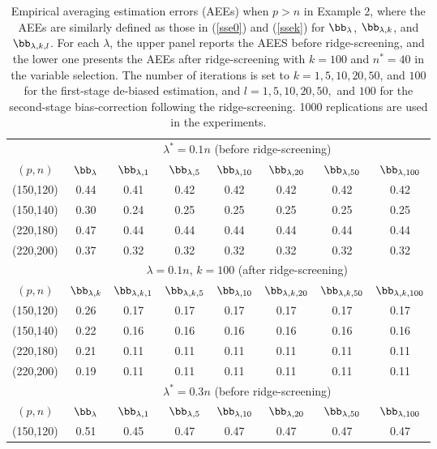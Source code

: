 {{\begin{table}[htp]\scriptsize
\caption{Empirical averaging estimation errors (AEEs) when $p> n$ in Example 2, where the AEEs are similarly defined as those in (\ref{sse0}) and (\ref{ssek}) for $\bb_{\lambda}$, $\bb_{\lambda,k}$, and $\bb_{\lambda,k,l}$. For each $\lambda$, the upper panel reports the AEES before ridge-screening, and the lower one presents the AEEs after ridge-screening with $k=100$ and $n^*=40$ in the variable selection. The number of iterations is set to $k=1,5,10,20,50$, and $100$ for the first-stage de-biased estimation, and  $l=1,5,10,20,50,$ and $100$ for the second-stage bias-correction following the ridge-screening.   1000 replications are used in the experiments.} 
          \label{Table-a4}
{\begin{center}
\begin{tabular}{cccccccc}
\toprule
&\multicolumn{7}{c}{$\lambda^*=0.1n$ (before ridge-screening)}\\
\cline{2-8}
$(p,n)$&$\bb_{\lambda}$&$\bb_{\lambda,1}$&$\bb_{\lambda,5}$&$\bb_{\lambda,10}$&$\bb_{\lambda,20}$&$\bb_{\lambda,50}$&$\bb_{\lambda,100}$\\
\hline
(150,120)&0.44 &0.41& 0.42& 0.42& 0.42& 0.42 &0.42\\
(150,140)&0.30& 0.24& 0.25& 0.25& 0.25& 0.25& 0.25\\
(220,180)&0.47 &0.44& 0.44& 0.44& 0.44 &0.44 &0.44\\
(220,200)&0.37 &0.32 &0.32& 0.32 &0.32& 0.32& 0.32\\
\midrule
&\multicolumn{7}{c}{$\lambda=0.1n$, $k=100$ (after ridge-screening)}\\
\cline{2-8}
$(p,n)$&$\bb_{\lambda,k}$&$\bb_{\lambda,k,1}$&$\bb_{\lambda,k,5}$&$\bb_{\lambda,10}$&$\bb_{\lambda,k,20}$&$\bb_{\lambda,k,50}$&$\bb_{\lambda,k,100}$\\
\hline
(150,120)&0.26& 0.17& 0.17& 0.17 &0.17& 0.17 &0.17\\
(150,140)&0.22& 0.16 &0.16 &0.16& 0.16& 0.16& 0.16\\
(220,180)& 0.21& 0.11 &0.11& 0.11& 0.11& 0.11& 0.11\\
(220,200)&0.19& 0.11& 0.11 &0.11 &0.11& 0.11 &0.11\\
\midrule
\midrule
&\multicolumn{7}{c}{$\lambda^*=0.3n$ (before ridge-screening)}\\
\cline{2-8}
$(p,n)$&$\bb_{\lambda}$&$\bb_{\lambda,1}$&$\bb_{\lambda,5}$&$\bb_{\lambda,10}$&$\bb_{\lambda,20}$&$\bb_{\lambda,50}$&$\bb_{\lambda,100}$\\
\hline
(150,120)&0.51 &0.45& 0.47& 0.47& 0.47& 0.47 &0.47\\

\end{tabular}
\end{center}}
\end{table}}}
